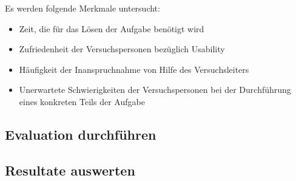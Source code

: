 Es werden folgende Merkmale untersucht:
\begin{itemize}
    \item Zeit, die für das Lösen der Aufgabe benötigt wird
    \item Zufriedenheit der Versuchspersonen bezüglich Usability
    \item Häufigkeit der Inanspruchnahme von Hilfe des Versuchsleiters
    \item Unerwartete Schwierigkeiten der Versuchspersonen bei der Durchführung eines konkreten Teils der Aufgabe
\end{itemize}

\subsection{Evaluation durchführen}

\subsection{Resultate auswerten}